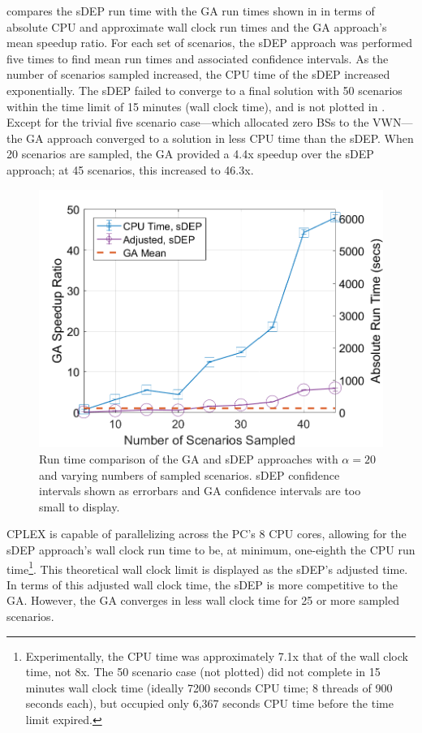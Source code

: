 \documentclass[12pt,dvipsnames]{report}
\begin{document}
 compares the sDEP run time with the GA run times shown in  in terms of absolute CPU and approximate wall clock run times and the GA approach's mean speedup ratio.  For each set of scenarios, the sDEP approach was performed five times to find mean run times and associated confidence intervals.  As the number of scenarios sampled increased, the CPU time of the sDEP increased exponentially.  The sDEP failed to converge to a final solution with 50 scenarios within the time limit of 15 minutes (wall clock time), and is not plotted in .  Except for the trivial five scenario case---which allocated zero BSs to the VWN---the GA approach converged to a solution in less CPU time than the sDEP.  When 20 scenarios are sampled, the GA provided a 4.4x speedup over the sDEP approach; at 45 scenarios, this increased to 46.3x.

\begin{figure}[htp]
	\centering
	\includegraphics[height=0.4\textheight]{Figures/Prelim_VOSGA_SpeedupRatio_AbsComp_alpha20}
	\caption[Run time comparison of the preliminary simulations GA and sDEP approaches with fixed $\alpha$]{Run time comparison of the GA and sDEP approaches with $\alpha = 20$ and varying numbers of sampled scenarios.  sDEP confidence intervals shown as errorbars and GA confidence intervals are too small to display.}
	\label{fig:Prelim_AlgSpeedupRunTime}
\end{figure}

CPLEX is capable of parallelizing across the PC's 8 CPU cores, allowing for the sDEP approach's wall clock run time to be, at minimum, one-eighth the CPU run time\footnote{Experimentally, the CPU time was approximately 7.1x that of the wall clock time, not 8x.  The 50 scenario case (not plotted) did not complete in 15 minutes wall clock time (ideally 7200 seconds CPU time; 8 threads of 900 seconds each), but occupied only 6,367 seconds CPU time before the time limit expired.}.  This theoretical wall clock limit is displayed as the sDEP's adjusted time.  In terms of this adjusted wall clock time, the sDEP is more competitive to the GA.  However, the GA converges in less wall clock time for 25 or more sampled scenarios.
\end{document}
